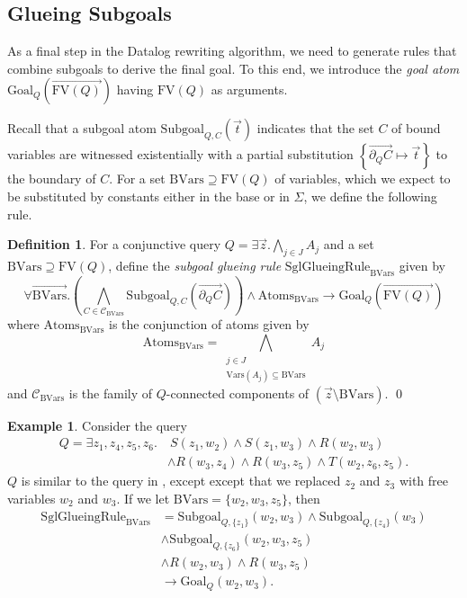 \documentclass[12pt]{report}
\theoremstyle{plain}
\theoremstyle{definition}
\newtheorem{definition}[theorem]{Definition}
\newtheorem{example}[theorem]{Example}
\def\FV{{\mathrm{FV}}}
\def\Vars{{\mathrm{Vars}}}
\begin{document}
\subsection{Glueing Subgoals}
\label{subsection:glueing-subgoals}

As a final step in the Datalog rewriting algorithm, we need to generate rules that combine subgoals to derive the final goal. To this end, we introduce the \emph{goal atom} $\mathrm{Goal}_Q\left( \overrightarrow{\FV(Q)} \right)$ having $\FV(Q)$ as arguments.

Recall that a subgoal atom $\mathrm{Subgoal}_{Q, C}(\vec{t})$ indicates that the set $C$ of bound variables are witnessed existentially with a partial substitution $\left\{ \overrightarrow{\partial_Q C} \mapsto \vec{t} \right\}$ to the boundary of $C$. For a set $\mathrm{BVars} \supseteq \FV(Q)$ of variables, which we expect to be substituted by constants either in the base or in $\Sigma$, we define the following rule.

\begin{definition}
  For a conjunctive query $Q = \exists \vec{z}. \bigwedge_{j \in J} A_j$ and a set $\mathrm{BVars} \supseteq \FV(Q)$, define the \emph{subgoal glueing rule} $\mathrm{SglGlueingRule}_\mathrm{BVars}$ given by
  $$
    \forall \overrightarrow{\mathrm{BVars}}. \left(
      \bigwedge_{C \in \mathcal{C}_\mathrm{BVars}} \mathrm{Subgoal}_{Q, C}\left(\overrightarrow{\partial_Q C}\right)
    \right) \wedge \mathrm{Atoms}_\mathrm{BVars}
    \rightarrow \mathrm{Goal}_Q\left( \overrightarrow{\FV(Q)} \right)
  $$
  where $\mathrm{Atoms}_\mathrm{BVars}$ is the conjunction of atoms given by $$
    \mathrm{Atoms}_\mathrm{BVars} = \bigwedge_{\substack{j \in J \\ \Vars(A_j) \subseteq \mathrm{BVars}}} A_j
  $$ and $\mathcal{C}_\mathrm{BVars}$ is the family of $Q$-connected components of $(\vec{z} \setminus \mathrm{BVars})$.
  \qed
\end{definition}

\begin{example}
\label{example:glueing-rule}
  Consider the query
  \begin{align*}
    Q = \exists z_1,z_4,z_5,z_6.&\ S(z_1, w_2) \wedge S(z_1,w_3) \wedge R(w_2, w_3) \\
    &\wedge R(w_3, z_4) \wedge R(w_3, z_5) \wedge T(w_2, z_6, z_5).
  \end{align*}
  $Q$ is similar to the query in , except except that we replaced $z_2$ and $z_3$ with free variables $w_2$ and $w_3$. If we let $\mathrm{BVars} = \{w_2, w_3, z_5\}$, then \begin{align*}
    \mathrm{SglGlueingRule}_{\mathrm{BVars}}
      &= \mathrm{Subgoal}_{Q, \{z_1\}}(w_2, w_3) \wedge \mathrm{Subgoal}_{Q, \{z_4\}}(w_3) \\
      &\wedge \mathrm{Subgoal}_{Q, \{z_6\}}(w_2, w_3, z_5) \\
      &\wedge R(w_2, w_3) \wedge R(w_3, z_5) \\
      &\rightarrow \mathrm{Goal}_Q(w_2, w_3).
  \end{align*}
\end{example}
\end{document}
